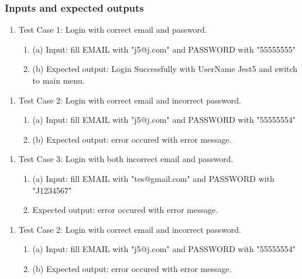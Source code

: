\documentclass[11pt]{article}
\begin{document}
    \subsubsection*{Inputs and expected outputs}
    \begin{enumerate}
        \item Test Case 1: Login with correct email and password.
        \begin{enumerate}
            \item (a) Input: fill EMAIL with "j5@j.com" and PASSWORD with "55555555"
            \item (b) Expected output: Login Successfully with UserName Jest5 and switch to main menu.
        \end{enumerate}
    \end{enumerate}
    \begin{enumerate}
        \item Test Case 2: Login with correct email and incorrect password.
        \begin{enumerate}
            \item (a) Input: fill EMAIL with "j5@j.com" and PASSWORD with "55555554"
            \item (b) Expected output: error occured with error message.

        \end{enumerate}
    \end{enumerate}
    \begin{enumerate}
        \item Test Case 3: Login with both incorrect email and password.
        \begin{enumerate}
            \item (a) Input: fill EMAIL with "tes@gmail.com" and PASSWORD with "J1234567"
            \item Expected output: error occured with error message.
        \end{enumerate}
    \end{enumerate}
    \begin{enumerate}
        \item Test Case 2: Login with correct email and incorrect password.
        \begin{enumerate}
            \item (a) Input: fill EMAIL with "j5@j.com" and PASSWORD with "55555554"
            \item (b) Expected output: error occured with error message.

        \end{enumerate}
    \end{enumerate}
\end{document}
